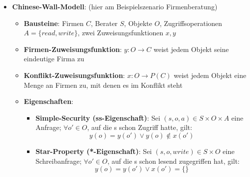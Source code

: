 \begin{itemize}
\begin{itemize}
	\end{itemize}
	\item \textbf{Chinese-Wall-Modell}: (hier am Beispielszenario Firmenberatung)
	\begin{itemize}
		\item \textbf{Bausteine}: Firmen $C$, Berater $S$, Objekte $O$, Zugriffsoperationen $A = \{read, write\}$, zwei Zuweisungsfunktionen $x, y$
		\item \textbf{Firmen-Zuweisungsfunktion}: $y: O \rightarrow C$ weist jedem Objekt seine eindeutige Firma zu
		\item \textbf{Konflikt-Zuweisungsfunktion}: $x: O \rightarrow P(C)$ weist jedem Objekt eine Menge an Firmen zu, mit denen es im Konflikt steht
		\item \textbf{Eigenschaften}:
		\begin{itemize}
			\item \textbf{Simple-Security (ss-Eigenschaft)}: Sei $(s, o, a) \in S \times O \times A$ eine Anfrage; $\forall o' \in O$, auf die s schon Zugriff hatte, gilt:
			$$
				y(o) = y(o') \lor y(o) \notin x(o')
			$$
			\item \textbf{Star-Property (*-Eigenschaft)}: Sei $(s, o, write) \in S \times O$ eine Schreibanfrage; $\forall o' \in O$, auf die s schon lesend zugegriffen hat, gilt:
			$$
				y(o) = y(o') \lor x(o') = \{\}
			$$
		\end{itemize}
	\end{itemize}
\end{itemize}